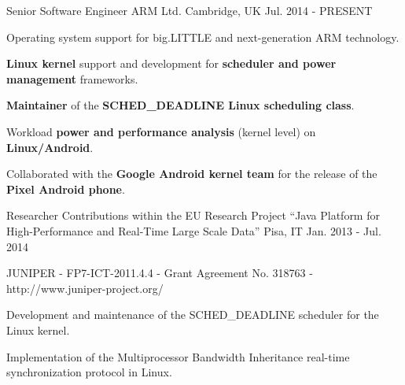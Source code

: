 

\begin{cventries}

  \cventry
    {Senior Software Engineer} %
    {ARM Ltd.} %
    {Cambridge, UK} %
    {Jul. 2014 - PRESENT} %
    {
      \begin{cvitems} %
        \item {Operating system support for big.LITTLE and next-generation ARM technology.}
	\item {\textbf{Linux kernel} support and development for \textbf{scheduler and power management} frameworks.}
        \item {\textbf{Maintainer} of the \textbf{SCHED\_DEADLINE Linux scheduling class}.}
	\item {Workload \textbf{power and performance analysis} (kernel level) on \textbf{Linux/Android}.}
	\item {Collaborated with the \textbf{Google Android kernel team} for the
		release of the \textbf{Pixel Android phone}.}
      \end{cvitems}
    }

  \cventry
    {Researcher} %
    {Contributions within the EU Research Project “Java Platform for High-Performance
	and Real-Time Large Scale Data”} %
    {Pisa, IT} %
    {Jan. 2013 - Jul. 2014} %
    {
      \begin{cvitems} %
	\item {JUNIPER - FP7-ICT-2011.4.4 - Grant Agreement No. 318763 - http://www.juniper-project.org/} %
	\item {Development and maintenance of the SCHED\_DEADLINE scheduler for
		the Linux kernel.}
        \item {Implementation of the Multiprocessor Bandwidth Inheritance
		real-time synchronization protocol in Linux.}
      \end{cvitems}
    }


\end{cventries}
